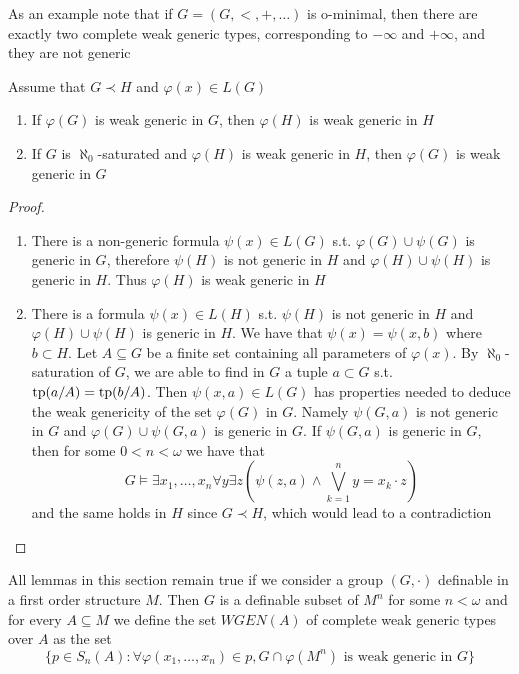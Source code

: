 \documentclass[11pt]{article}
\begin{document}
As an example note that if \(G=(G,<,+,\dots)\) is o-minimal, then there are exactly two complete weak
generic types, corresponding to \(-\infty\) and \(+\infty\), and they are not generic

\begin{lemma}[]
Assume that \(G\prec H\) and \(\varphi(x)\in L(G)\)
\begin{enumerate}
\item If \(\varphi(G)\) is weak generic in \(G\), then \(\varphi(H)\) is weak generic in \(H\)
\item If \(G\) is \(\aleph_0\)-saturated and \(\varphi(H)\) is weak generic in \(H\), then \(\varphi(G)\) is weak
generic in \(G\)
\end{enumerate}
\end{lemma}

\begin{proof}
\begin{enumerate}
\item There is a non-generic formula \(\psi(x)\in L(G)\) s.t. \(\varphi(G)\cup\psi(G)\) is generic in \(G\),
therefore \(\psi(H)\) is not generic in \(H\) and \(\varphi(H)\cup\psi(H)\) is generic in \(H\).
Thus \(\varphi(H)\) is weak generic in \(H\)
\item There is a formula \(\psi(x)\in L(H)\) s.t. \(\psi(H)\) is not generic in \(H\) and \(\varphi(H)\cup\psi(H)\) is
generic in \(H\). We have that \(\psi(x)=\psi(x,b)\) where \(b\subset H\). Let \(A\subseteq G\)  be a finite set
containing all parameters of \(\varphi(x)\). By \(\aleph_0\)-saturation of \(G\), we are able to find
in \(G\) a tuple \(a\subset G\) s.t. \(\operatorname{tp}(a/A)=\operatorname{tp}(b/A)\). Then \(\psi(x,a)\in L(G)\) has properties
needed to deduce the weak genericity of the set \(\varphi(G)\) in \(G\). Namely \(\psi(G,a)\) is not
generic in \(G\) and \(\varphi(G)\cup\psi(G,a)\) is generic in \(G\). If \(\psi(G,a)\) is generic in \(G\),
then for some \(0<n<\omega\) we have that
\begin{equation*}
G\vDash\exists x_1,\dots,x_n\forall y\exists z(\psi(z,a)\wedge\bigvee_{k=1}^ny=x_k\cdot z)
\end{equation*}
and the same holds in \(H\) since \(G\prec H\), which would lead to a contradiction
\end{enumerate}
\end{proof}

All lemmas in this section remain true if we consider a group \((G,\cdot)\) definable in a first
order structure \(M\). Then \(G\) is a definable subset of \(M^n\) for some \(n<\omega\) and for
every \(A\subseteq M\) we define the set \(WGEN(A)\) of complete weak generic types over \(A\) as the
set
\begin{equation*}
\{p\in S_n(A):\forall\varphi(x_1,\dots,x_n)\in p,G\cap\varphi(M^n)\text{ is weak generic in }G\}
\end{equation*}
\end{document}
